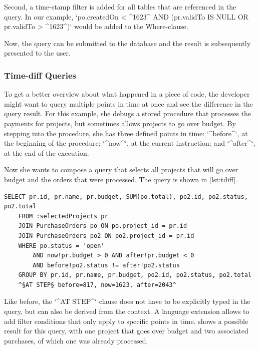 \documentclass[english]{scrartcl}
\begin{document}
Second, a time-stamp filter is added for all tables that are referenced in the query. 
In our example, `po.createdOn < ^1623^ AND (pr.validTo IS NULL OR pr.validTo > ^1623^)` would be added to the Where-clause.

Now, the query can be submitted to the database and the result is subsequently presented to the user.

\subsubsection{Time-diff Queries}

To get a better overview about what happened in a piece of code, the developer might want to query multiple points in time at once and see the difference in the query result.
For this example, she debugs a stored procedure that processes the payments for projects, but sometimes allows projects to go over budget.
By stepping into the procedure, she has three defined points in time: `^before^`, at the beginning of the procedure; `^now^`, at the current instruction; and `^after^`, at the end of the execution.

Now she wants to compose a query that selects all projects that will go over budget and the orders that were processed.
The query is shown in \cref{lst:tdiff}.
\begin{lstlisting}[language=HanaSQL,float=b,caption={Example of a time-diff query: "Select all projects that will go over budget and their respective purchase orders"},label=lst:tdiff]
	SELECT pr.id, pr.name, pr.budget, SUM(po.total), po2.id, po2.status, po2.total
	FROM :selectedProjects pr
	JOIN PurchaseOrders po ON po.project_id = pr.id
	JOIN PurchaseOrders po2 ON po2.project_id = pr.id
	WHERE po.status = 'open'
		AND now!pr.budget > 0 AND after!pr.budget < 0
		AND before!po2.status != after!po2.status
	GROUP BY pr.id, pr.name, pr.budget, po2.id, po2.status, po2.total
	^§AT STEP§ before=817, now=1623, after=2043^
\end{lstlisting}
Like before, the `^AT STEP^` clause does not have to be explicitly typed in the query, but can also be derived from the context.
A language extension allows to add filter conditions that only apply to specific points in time.
 shows a possible result for this query, with one project that goes over budget and two associated purchases, of which one was already processed.

\newcommand{\red}[1]{\textcolor{DarkRed}{#1}}
\newcommand{\gr}[1]{\textcolor{Green}{#1}}
\end{document}
